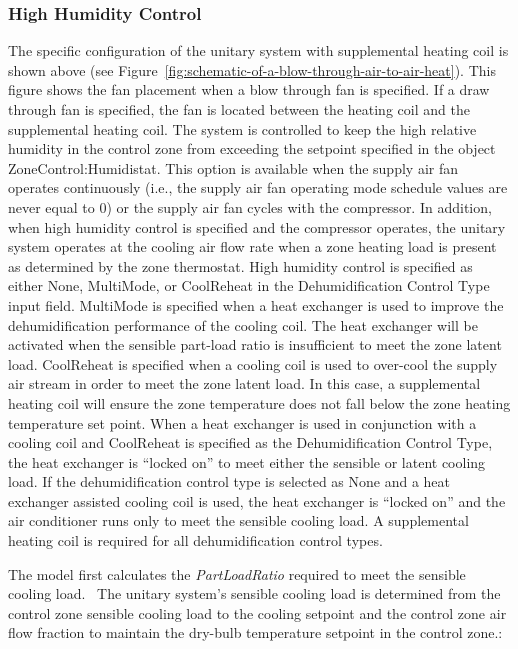 \subsubsection{High Humidity Control}\label{high-humidity-control}

The specific configuration of the unitary system with supplemental heating coil is shown above (see Figure~\ref{fig:schematic-of-a-blow-through-air-to-air-heat}). This figure shows the fan placement when a blow through fan is specified. If a draw through fan is specified, the fan is located between the heating coil and the supplemental heating coil. The system is controlled to keep the high relative humidity in the control zone from exceeding the setpoint specified in the object ZoneControl:Humidistat. This option is available when the supply air fan operates continuously (i.e., the supply air fan operating mode schedule values are never equal to 0) or the supply air fan cycles with the compressor. In addition, when high humidity control is specified and the compressor operates, the unitary system operates at the cooling air flow rate when a zone heating load is present as determined by the zone thermostat. High humidity control is specified as either None, MultiMode, or CoolReheat in the Dehumidification Control Type input field. MultiMode is specified when a heat exchanger is used to improve the dehumidification performance of the cooling coil. The heat exchanger will be activated when the sensible part-load ratio is insufficient to meet the zone latent load. CoolReheat is specified when a cooling coil is used to over-cool the supply air stream in order to meet the zone latent load. In this case, a supplemental heating coil will ensure the zone temperature does not fall below the zone heating temperature set point. When a heat exchanger is used in conjunction with a cooling coil and CoolReheat is specified as the Dehumidification Control Type, the heat exchanger is ``locked on'' to meet either the sensible or latent cooling load. If the dehumidification control type is selected as None and a heat exchanger assisted cooling coil is used, the heat exchanger is ``locked on'' and the air conditioner runs only to meet the sensible cooling load. A supplemental heating coil is required for all dehumidification control types.

The model first calculates the \emph{PartLoadRatio} required to meet the sensible cooling load.~ The unitary system's sensible cooling load is determined from the control zone sensible cooling load to the cooling setpoint and the control zone air flow fraction to maintain the dry-bulb temperature setpoint in the control zone.:

